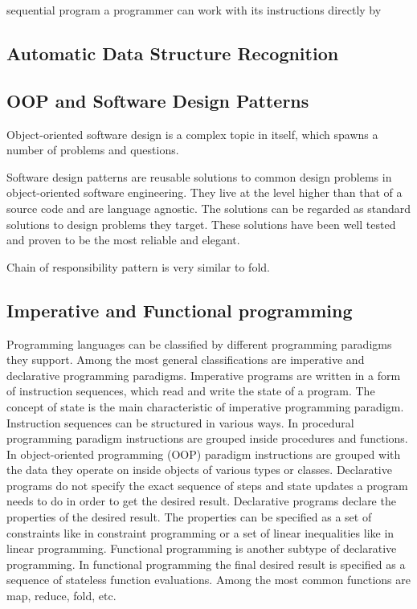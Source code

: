 sequential program a programmer can work with its instructions directly by 



\subsection{Automatic Data Structure Recognition}

\subsection{OOP and Software Design Patterns}
\quad Object-oriented software design is a complex topic in itself, which spawns a number of problems and questions. 

\quad Software design patterns are reusable solutions to common design problems in object-oriented software engineering. They live at the level higher than that of a source code and are language agnostic. The solutions can be regarded as standard solutions to design problems they target. These solutions have been well tested and proven to be the most reliable and elegant.

Chain of responsibility pattern is very similar to fold.


\subsection{Imperative and Functional programming}
\quad Programming languages can be classified by different programming paradigms they support. Among the most general classifications are imperative and declarative programming paradigms.\newline\null
\quad Imperative programs are written in a form of instruction sequences, which read and write the state of a program. The concept of state is the main characteristic of imperative programming paradigm. Instruction sequences can be structured in various ways. In procedural programming paradigm instructions are grouped inside procedures and functions. In object-oriented programming (OOP) paradigm instructions are grouped with the data they operate on inside objects of various types or classes.\newline\null
\quad Declarative programs do not specify the exact sequence of steps and state updates a program needs to do in order to get the desired result. Declarative programs declare the properties of the desired result. The properties can be specified as a set of constraints like in constraint programming or a set of linear inequalities like in linear programming. Functional programming is another subtype of declarative programming. In functional programming the final desired result is specified as a sequence of stateless function evaluations. Among the most common functions are map, reduce, fold, etc.       
